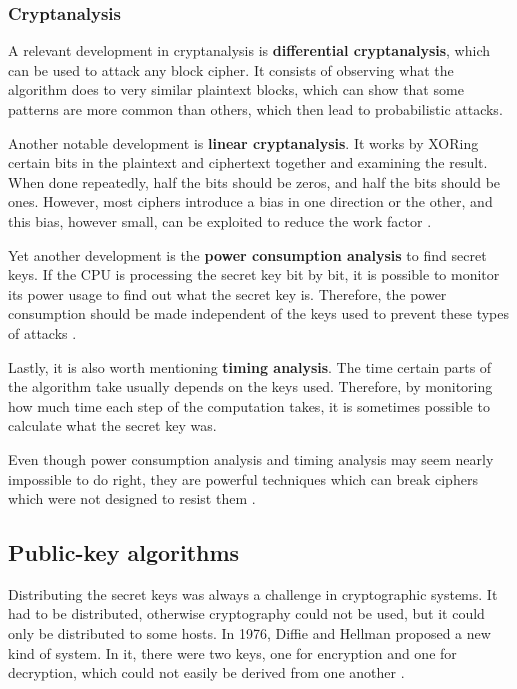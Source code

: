 \subsubsection{Cryptanalysis}

A relevant development in cryptanalysis is \textbf{differential cryptanalysis}, which can be used to attack any block cipher.
It consists of observing what the algorithm does to very similar plaintext blocks, which can show that some patterns are more common than others, which then lead to probabilistic attacks.

Another notable development is \textbf{linear cryptanalysis}.
It works by XORing certain bits in the plaintext and ciphertext together and examining the result.
When done repeatedly, half the bits should be zeros, and half the bits should be ones.
However, most ciphers introduce a bias in one direction or the other, and this bias, however small, can be exploited to reduce the work factor \cite[p.~793]{computer-networks-tanenbaum-2012}.

Yet another development is the \textbf{power consumption analysis} to find secret keys.
If the CPU is processing the secret key bit by bit, it is possible to monitor its power usage to find out what the secret key is.
Therefore, the power consumption should be made independent of the keys used to prevent these types of attacks \cite[p.~793]{computer-networks-tanenbaum-2012}.

Lastly, it is also worth mentioning \textbf{timing analysis}. The time certain parts of the algorithm take usually depends on the keys used.
Therefore, by monitoring how much time each step of the computation takes, it is sometimes possible to calculate what the secret key was.

Even though power consumption analysis and timing analysis may seem nearly impossible to do right, they are powerful techniques which can break ciphers which were not designed to resist them \cite[p.~793]{computer-networks-tanenbaum-2012}.

\subsection{Public-key algorithms}

Distributing the secret keys was always a challenge in cryptographic systems. It had to be distributed, otherwise cryptography could not be used, but it could only be distributed to some hosts.
In 1976, Diffie and Hellman proposed a new kind of system. In it, there were two keys, one for encryption and one for decryption, which could not easily be derived from one another \cite[p.~794]{computer-networks-tanenbaum-2012}.

